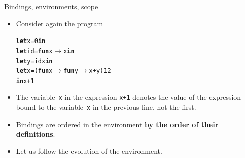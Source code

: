 \documentclass[compress,dvipdfmx]{beamer}
\begin{document}
%
\begin{frame}[fragile]{Bindings, environments, scope}

  \begin{itemize}

    \item Consider again the program
\vspace*{-3mm}
\begin{alltt}
\small
\textbf{let} x = 0 \textbf{in}
\textbf{let} id = \textbf{fun} x \(\rightarrow\) x \textbf{in}
\textbf{let} y = id x \textbf{in}
\textbf{let} x = (\textbf{fun} x \(\rightarrow\) \textbf{fun} y \(\rightarrow\) x + y) 1 2
\textbf{in} x + 1
\end{alltt}

    \item The variable~\texttt{\small x} in the expression
      \texttt{\small x+1} denotes the value of the expression bound to
      the variable~\texttt{\small x} in the previous line, not the
      first.

    \item Bindings are ordered in the environment \textbf{by the order
      of their definitions}.

    \item Let us follow the evolution of the environment.

  \end{itemize}

\end{frame}
\end{document}
